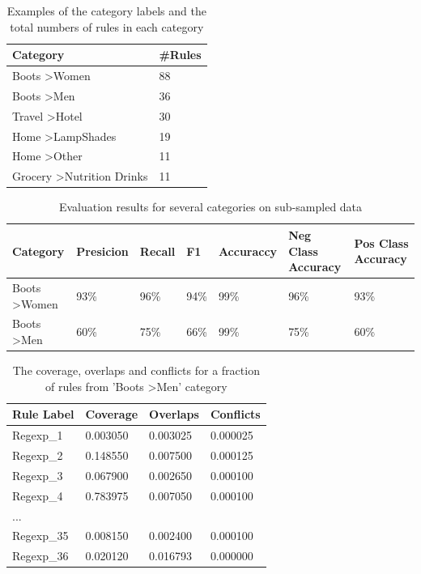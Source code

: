 \begin{table}
  \caption{Examples of the category labels and the total numbers of rules in each category}
  \label{tab:numrules}
  \begin{tabular}{ll}
    \toprule
    Category & \#Rules\\
    \midrule
    Boots \textgreater Women &	88	\\
    Boots \textgreater Men	& 36 \\
 	Travel \textgreater Hotel & 30 \\
 	Home \textgreater LampShades & 19 \\
 	Home \textgreater Other & 11 \\
 	Grocery \textgreater Nutrition Drinks & 11 \\
    \bottomrule
  \end{tabular}
\end{table}

\begin{table}
  \caption{Evaluation results for several categories on sub-sampled data}
  \label{tab:evaluation}
  \begin{tabular}{lllllll}
    \toprule
    Category & Presicion & Recall & F1 & Accuraccy & Neg Class Accuracy & Pos Class Accuracy\\
    \midrule 
    Boots \textgreater Women	& 93\% & 96\% & 94\% & 99\% & 96\% & 93\% \\
    Boots \textgreater Men &	60\%	& 75\% & 66\% & 99\% & 75\% & 60\% \\
    \bottomrule
  \end{tabular}
\end{table}

\begin{table}
  \caption{The coverage, overlaps and conflicts for a fraction of rules from 'Boots \textgreater Men' category}
  \label{tab:overlapconflict}
  \begin{tabular}{llll}
    \toprule
    Rule Label & Coverage & Overlaps & Conflicts \\
    \midrule
    Regexp\_1	& 0.003050 & 0.003025 & 0.000025 \\
    Regexp\_2	& 0.148550 & 0.007500 & 0.000125 \\
    Regexp\_3	& 0.067900 & 0.002650 & 0.000100 \\
    Regexp\_4	& 0.783975 & 0.007050 & 0.000100 \\
    ... \\
    Regexp\_{35}	& 0.008150 & 0.002400 & 0.000100 \\
    Regexp\_{36}	& 0.020120 & 0.016793 & 0.000000 \\
    \bottomrule
  \end{tabular}
\end{table}


